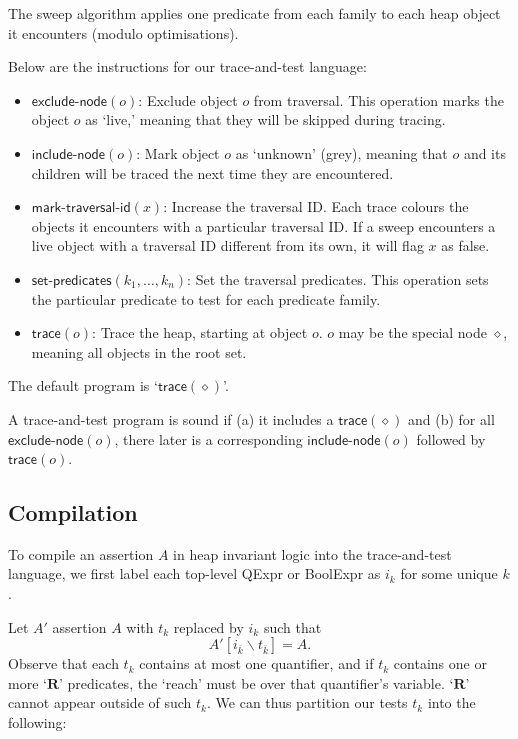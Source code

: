 \documentclass{report}
\newcommand{\reachOp}{\ensuremath{\mathbf{R}}}
\newcommand{\NT}[1]{\textsf{#1}}
\newcommand{\TTexclude}{\textsf{exclude-node}}
\newcommand{\TTinclude}{\textsf{include-node}}
\newcommand{\TTtid}{\textsf{mark-traversal-id}}
\newcommand{\TTset}{\textsf{set-predicates}}
\newcommand{\TTtrace}{\textsf{trace}}
\newcommand{\roots}{\ensuremath{\diamond}}
\begin{document}
The sweep algorithm applies one predicate from each family to each
heap object it encounters (modulo optimisations).

Below are the instructions for our trace-and-test language:

\begin{itemize}
  \item $\TTexclude(o)$: Exclude object $o$ from traversal.  This
    operation marks the object $o$ as `live,' meaning that
    they will be skipped during tracing.
  \item $\TTinclude(o)$: Mark object $o$ as `unknown' (grey), meaning
    that $o$ and its children will be traced the next time they are
    encountered.
  \item $\TTtid(x)$: Increase the traversal ID.  Each trace colours
    the objects it encounters with a particular traversal ID.  If a
    sweep encounters a live object with a traversal ID different from
    its own, it will flag $x$ as \textsf{false}.
  \item $\TTset(k_1, \ldots, k_n)$: Set the traversal predicates.
    This operation sets the particular predicate to test for each
    predicate family.
  \item $\TTtrace(o)$: Trace the heap, starting at object $o$.  $o$ may
    be the special node \roots, meaning all objects in the root set.
\end{itemize}


The default program is `$\TTtrace(\roots)$'.

A trace-and-test program is sound if (a) it includes a
$\TTtrace(\roots)$ and (b) for all $\TTexclude(o)$, there later is a
corresponding $\TTinclude(o)$ followed by $\TTtrace(o)$.

\subsection{Compilation}

To compile an assertion $A$ in heap invariant logic into the
trace-and-test language, we first label
each top-level \NT{QExpr} or \NT{BoolExpr}
as $i_k$ for some unique $k$. 

Let $A'$ assertion $A$ with $t_k$ replaced by $i_k$ such that
\[
 A'[i_{\overline{k}} \backslash t_{\overline{k}}] = A.
\]
Observe that each $t_k$ contains at most one quantifier, and if $t_k$
contains one or more `\reachOp{}' predicates, the `reach' must be over that
quantifier's variable.  `\reachOp{}' cannot appear outside of such
$t_k$.  We can thus partition our tests $t_k$ into the following:
\end{document}
